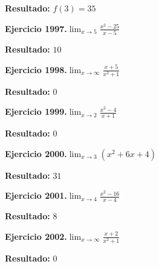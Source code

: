 \documentclass[10pt,a4paper]{article}
\begin{document}
\begin{solbox}
\textbf{Resultado:} \(\displaystyle f(3) = 35\)
\end{solbox}

\begin{ejbox}
\textbf{Ejercicio 1997.}\quad $\lim_{x\to 5} \frac{x^2-25}{x-5}$
\end{ejbox}

\begin{solbox}
\textbf{Resultado:} \(\displaystyle 10\)
\end{solbox}

\begin{ejbox}
\textbf{Ejercicio 1998.}\quad $\lim_{x\to \infty} \frac{x + 5}{x^2 + 1}$
\end{ejbox}

\begin{solbox}
\textbf{Resultado:} \(\displaystyle 0\)
\end{solbox}

\newpage
\begin{ejbox}
\textbf{Ejercicio 1999.}\quad $\lim_{x\to 2} \frac{x^2-4}{x+1}$
\end{ejbox}

\begin{solbox}
\textbf{Resultado:} \(\displaystyle 0\)
\end{solbox}

\begin{ejbox}
\textbf{Ejercicio 2000.}\quad $\lim_{x\to 3} (x^2 +6x +4)$
\end{ejbox}

\begin{solbox}
\textbf{Resultado:} \(\displaystyle 31\)
\end{solbox}

\begin{ejbox}
\textbf{Ejercicio 2001.}\quad $\lim_{x\to 4} \frac{x^2-16}{x-4}$
\end{ejbox}

\begin{solbox}
\textbf{Resultado:} \(\displaystyle 8\)
\end{solbox}

\newpage
\begin{ejbox}
\textbf{Ejercicio 2002.}\quad $\lim_{x\to \infty} \frac{x + 2}{x^2 + 1}$
\end{ejbox}

\begin{solbox}
\textbf{Resultado:} \(\displaystyle 0\)
\end{solbox}
\end{document}
